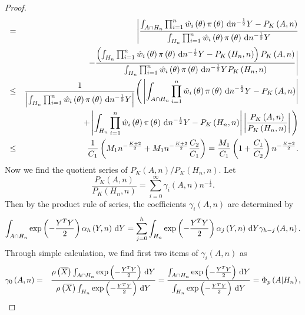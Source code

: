 \begin{thm}
\begin{proof}
\begin{eqnarray}
 & = & \Bigg|\frac{\int_{A\cap H_{n}}\prod_{i=1}^{n}\hat{w}_{i}\left(\theta\right)\pi\left(\theta\right)\,\mathrm{d} n^{-\frac{1}{2}}Y-P_{K}\left(A,n\right)}{\int_{H_{n}}\prod_{i=1}^{n}\hat{w}_{i}\left(\theta\right)\pi\left(\theta\right)\,\mathrm{d} n^{-\frac{1}{2}}Y}\nonumber \\
 &  & -\frac{\left(\int_{H_{n}}\prod_{i=1}^{n}\hat{w}_{i}\left(\theta\right)\pi\left(\theta\right)\,\mathrm{d} n^{-\frac{1}{2}}Y-P_{K}\left(H_{n},n\right)\right)P_{K}\left(A,n\right)}{\int_{H_{n}}\prod_{i=1}^{n}\hat{w}_{i}\left(\theta\right)\pi\left(\theta\right)\,\mathrm{d} n^{-\frac{1}{2}}YP_{K}\left(H_{n},n\right)}\Bigg|\nonumber \\
 & \le & \frac{1}{\left|\int_{H_{n}}\prod_{i=1}^{n}\hat{w}_{i}\left(\theta\right)\pi\left(\theta\right)\,\mathrm{d} n^{-\frac{1}{2}}Y\right|}\Bigg(\left|\int_{A\cap H_{n}}\prod_{i=1}^{n}\hat{w}_{i}\left(\theta\right)\pi\left(\theta\right)\,\mathrm{d} n^{-\frac{1}{2}}Y-P_{K}\left(A,n\right)\right|\nonumber \\
 &  & +\left|\int_{H_{n}}\prod_{i=1}^{n}\hat{w}_{i}\left(\theta\right)\pi\left(\theta\right)\,\mathrm{d} n^{-\frac{1}{2}}Y-P_{K}\left(H_{n},n\right)\right|\left|\frac{P_{K}\left(A,n\right)}{P_{K}\left(H_{n},n\right)}\right|\Bigg)\nonumber \\
 & \le & \frac{1}{C_{1}}\left(M_{1}n^{-\frac{K+2}{2}}+M_{1}n^{-\frac{K+2}{2}}\frac{C_{2}}{C_{1}}\right)=\frac{M_{1}}{C_{1}}\left(1+\frac{C_{1}}{C_{2}}\right)n^{-\frac{K+2}{2}}.\label{eq:two-quotient-close}
\end{eqnarray}
Now we find the quotient series of $P_{K}\left(A,n\right)/P_{K}\left(H_{n},n\right)$.
Let 
\[
\frac{P_{K}\left(A,n\right)}{P_{K}\left(H_{n},n\right)}=\sum_{i=0}^{\infty}\gamma_{i}\left(A,n\right)n^{-\frac{i}{2}}.
\]
Then by the product rule of series, the coefficients $\gamma_{i}\left(A,n\right)$
are determined by 
\[
\int_{A\cap H_{n}}\exp\left(-\frac{Y^{T}Y}{2}\right)\alpha_{h}\left(Y,n\right)\,\mathrm{d} Y=\sum_{j=0}^{h}\int_{H_{n}}\exp\left(-\frac{Y^{T}Y}{2}\right)\alpha_{j}\left(Y,n\right)\,\mathrm{d} Y\gamma_{h-j}\left(A,n\right).
\]
Through simple calculation, we find first two items of $\gamma_{i}\left(A,n\right)$
as
\begin{eqnarray*}
\gamma_{0}\left(A,n\right) & = & \frac{\rho\left(\overline{X}\right)\int_{A\cap H_{n}}\exp\left(-\frac{Y^{T}Y}{2}\right)\diff Y}{\rho\left(\overline{X}\right)\int_{H_{n}}\exp\left(-\frac{Y^{T}Y}{2}\right)\diff Y}=\frac{\int_{A\cap H_{n}}\exp\left(-\frac{Y^{T}Y}{2}\right)\diff Y}{\int_{H_{n}}\exp\left(-\frac{Y^{T}Y}{2}\right)\diff Y}=\Phi_{p}\left(A|H_{n}\right),\\

\end{eqnarray*}
\end{proof}
\end{thm}
